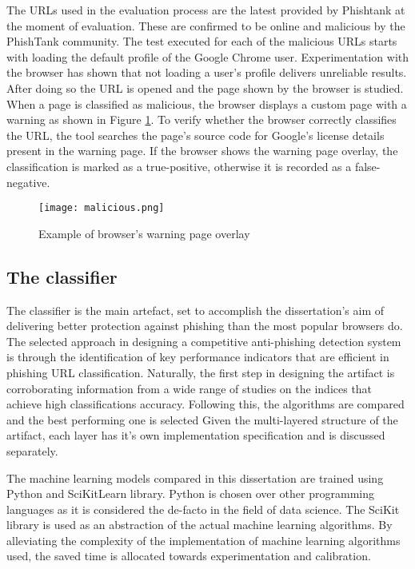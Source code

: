 The URLs used in the evaluation process are the latest provided by Phishtank at the moment of evaluation. These are confirmed to be online and malicious by the PhishTank community. The test executed for each of the malicious URLs starts with loading the default profile of the Google Chrome user. Experimentation with the browser has shown that not loading a user's profile delivers unreliable results. After doing so the URL is opened and the page shown by the browser is studied. When a page is classified as malicious, the browser displays a custom page with a warning as shown in Figure \ref{fig:PHISHING_PREVENTED}. To verify whether the browser correctly classifies the URL, the tool searches the page's source code for Google's license details present in the warning page. If the browser shows the warning page overlay, the classification is marked as a true-positive, otherwise it is recorded as a false-negative.

\begin{figure}
	\centering
	\texttt{[image: malicious.png]}
	\caption{Example of browser's warning page overlay}
	\label{fig:PHISHING_PREVENTED}
\end{figure}

\subsection{The classifier}
The classifier is the main artefact, set to accomplish the dissertation's aim of delivering better protection against phishing than the most popular browsers do. The selected approach in designing a competitive anti-phishing detection system is through the identification of key performance indicators that are efficient in phishing URL classification. Naturally, the first step in designing the artifact is corroborating information from a wide range of studies on the indices that achieve high classifications accuracy. Following this, the algorithms are compared and the best performing one is selected
Given the multi-layered structure of the artifact, each layer has it's own implementation specification and is discussed separately.


The machine learning models compared in this dissertation are trained using Python and SciKitLearn library. Python is chosen over other programming languages as it is considered the de-facto in the field of data science. The SciKit library is used as an abstraction of the actual machine learning algorithms. By alleviating the complexity of the implementation of machine learning algorithms used, the saved time is allocated towards experimentation and calibration.


